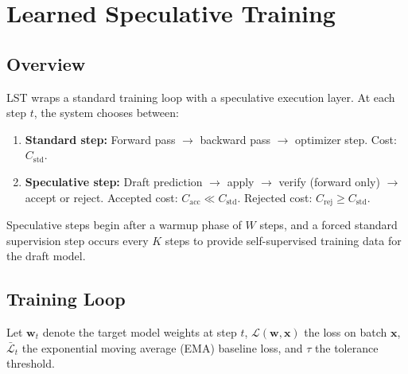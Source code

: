 \documentclass[conference]{IEEEtran}
\begin{document}
\section{Learned Speculative Training}

\subsection{Overview}

LST wraps a standard training loop with a speculative execution layer. At each step $t$, the system chooses between:

\begin{enumerate}
    \item \textbf{Standard step:} Forward pass $\rightarrow$ backward pass $\rightarrow$ optimizer step. Cost: $C_{\mathrm{std}}$.
    \item \textbf{Speculative step:} Draft prediction $\rightarrow$ apply $\rightarrow$ verify (forward only) $\rightarrow$ accept or reject. Accepted cost: $C_{\mathrm{acc}} \ll C_{\mathrm{std}}$. Rejected cost: $C_{\mathrm{rej}} \geq C_{\mathrm{std}}$.
\end{enumerate}

Speculative steps begin after a warmup phase of $W$ steps, and a forced standard supervision step occurs every $K$ steps to provide self-supervised training data for the draft model.

\subsection{Training Loop}

Let $\mathbf{w}_t$ denote the target model weights at step $t$, $\mathcal{L}(\mathbf{w}, \mathbf{x})$ the loss on batch $\mathbf{x}$, $\bar{\mathcal{L}}_t$ the exponential moving average (EMA) baseline loss, and $\tau$ the tolerance threshold.
\end{document}
